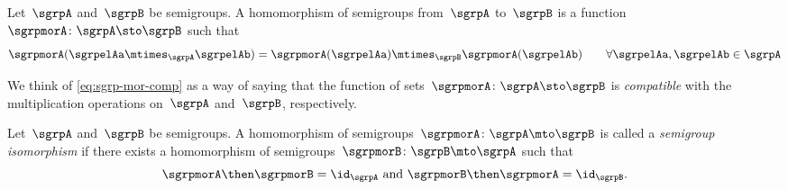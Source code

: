 

\section{\wHomos}

\begin{ctdefinition}
  \label{def:semigroup-mor}
  Let~$\sgrpA$ and~$\sgrpB$ be semigroups. A homomorphism of semigroups from~$\sgrpA$ to~$\sgrpB$ is a function~$\sgrpmorA\colon \sgrpA \sto \sgrpB$ such that
  \begin{equation}
    \label{eq:sgrp-mor-comp}
    \sgrpmorA(\sgrpelAa \mtimes_{\sgrpA} \sgrpelAb) = \sgrpmorA (\sgrpelAa) \mtimes_{\sgrpB} \sgrpmorA(\sgrpelAb) \quad \quad \forall \sgrpelAa, \sgrpelAb \in \sgrpA
  \end{equation}

\end{ctdefinition}

We think of   \cref{eq:sgrp-mor-comp} as a way of saying that the function of sets~$\sgrpmorA\colon \sgrpA \sto \sgrpB$  is \emph{compatible} with the multiplication operations on~$\sgrpA$ and~$\sgrpB$, respectively.

\begin{definition}
  \label{def:semigroup-iso}
  Let~$\sgrpA$ and~$\sgrpB$ be semigroups.
  A homomorphism of semigroups~$\sgrpmorA\colon \sgrpA \mto \sgrpB$ is called a \emph{semigroup isomorphism} if there exists a homomorphism of semigroups~$\sgrpmorB\colon \sgrpB \mto \sgrpA$ such that
  \begin{equation}
    \label{eq:sgrp-iso-cond}
    \sgrpmorA \then \sgrpmorB = \id_\sgrpA \text{ and }  \sgrpmorB \then \sgrpmorA = \id_\sgrpB.
  \end{equation}
\end{definition}



